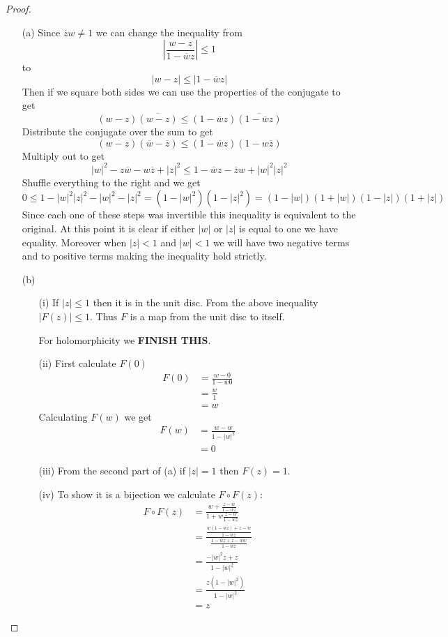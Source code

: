\documentclass[10pt]{article}
\newcommand{\conj}[1]{\overline{#1}}
\theoremstyle{plain}
\theoremstyle{remark}
\begin{document}
\begin{proof}
  \begin{itemize}
  \item[(a)] Since $\conj{z}w\neq 1$ we can change the inequality from
    \[
      \left|
        \frac{w-z}{1-\conj{w}{z}}
      \right| \leq 1
    \]
    to
    \[
      |w-z|\leq |1-\conj{w}z|
    \]
    Then if we square both sides we can use the properties of the conjugate
    to get
    \[
      (w-z)\conj{(w-z)} \leq (1-\conj{w}z)\conj{(1-\conj{w}z)}
    \]
    Distribute the conjugate over the sum to get
    \[
      (w-z)(\conj{w}-\conj{z})\leq (1-\conj{w}z)(1-w\conj{z})
    \]
    Multiply out to get
    \[
      |w|^2-z\conj{w}-w\conj{z} + |z|^2\leq 1-\conj{w}z-\conj{z}w+|w|^2|z|^2
    \]
    Shuffle everything to the right and we get
    \[
      0 \leq 1-|w|^2|z|^2 -|w|^2-|z|^2 = (1-|w|^2)(1-|z|^2) = (1-|w|)(1+|w|)(1-|z|)(1+|z|)
    \]
    Since each one of these steps was invertible this inequality is equivalent
    to the original. At this point it is clear if either $|w|$ or $|z|$ is
    equal to one we have equality. Moreover when $|z|<1$ and $|w|<1$ we will
    have two negative terms and to positive terms making the inequality hold
    strictly.
  \item[(b)]
    \begin{itemize}
    \item[(i)] If $|z|\leq 1$ then  it is in the unit disc. From the above
      inequality $|F(z)|\leq 1$. Thus $F$ is a map from the unit disc to
      itself.

      For holomorphicity we \textbf{FINISH THIS}.
    \item[(ii)] First calculate $F(0)$
      \begin{align*}
        F(0) &= \frac{w-0}{1-\conj{w}0}\\
             &= \frac{w}{1}\\
             &= w
      \end{align*}
      Calculating $F(w)$ we get
      \begin{align*}
        F(w) &= \frac{w-w}{1-|w|^2}\\
             &= 0
      \end{align*}
    \item[(iii)] From the second part of (a) if $|z|=1$ then $F(z)=1$.
    \item[(iv)] To show it is a bijection we calculate $F\circ F(z)$:
      \begin{align*}
        F\circ F(z) &= \frac{w+\frac{z-w}{1-\conj{w}z}}{1+\conj{w}\frac{z-w}{1-\conj{w}z}}\\
                &= \frac{\frac{w(1-\conj{w}z)+z-w}{1-\conj{w}z}}{\frac{1-\conj{w}z+\conj{z}-\conj{w}w}{1-\conj{w}z}}\\
                &= \frac{-|w|^2z+z}{1-|w|^2}\\
                &= \frac{z(1-|w|^2)}{1-|w|^2}\\
                &= z
      \end{align*}
    \end{itemize}
  \end{itemize}
\end{proof}
\end{document}
